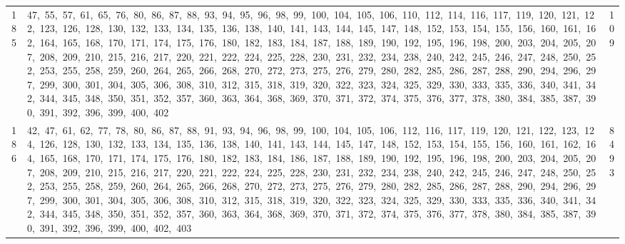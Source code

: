 \begin{longtable}{c|p{}|r}
185 & 47,\ 55,\ 57,\ 61,\ 65,\ 76,\ 80,\ 86,\ 87,\ 88,\ 93,\ 94,\ 95,\ 96,\ 98,\ 99,\ 100,\ 104,\ 105,\ 106,\ 110,\ 112,\ 114,\ 116,\ 117,\ 119,\ 120,\ 121,\ 122,\ 123,\ 126,\ 128,\ 130,\ 132,\ 133,\ 134,\ 135,\ 136,\ 138,\ 140,\ 141,\ 143,\ 144,\ 145,\ 147,\ 148,\ 152,\ 153,\ 154,\ 155,\ 156,\ 160,\ 161,\ 162,\ 164,\ 165,\ 168,\ 170,\ 171,\ 174,\ 175,\ 176,\ 180,\ 182,\ 183,\ 184,\ 187,\ 188,\ 189,\ 190,\ 192,\ 195,\ 196,\ 198,\ 200,\ 203,\ 204,\ 205,\ 207,\ 208,\ 209,\ 210,\ 215,\ 216,\ 217,\ 220,\ 221,\ 222,\ 224,\ 225,\ 228,\ 230,\ 231,\ 232,\ 234,\ 238,\ 240,\ 242,\ 245,\ 246,\ 247,\ 248,\ 250,\ 252,\ 253,\ 255,\ 258,\ 259,\ 260,\ 264,\ 265,\ 266,\ 268,\ 270,\ 272,\ 273,\ 275,\ 276,\ 279,\ 280,\ 282,\ 285,\ 286,\ 287,\ 288,\ 290,\ 294,\ 296,\ 297,\ 299,\ 300,\ 301,\ 304,\ 305,\ 306,\ 308,\ 310,\ 312,\ 315,\ 318,\ 319,\ 320,\ 322,\ 323,\ 324,\ 325,\ 329,\ 330,\ 333,\ 335,\ 336,\ 340,\ 341,\ 342,\ 344,\ 345,\ 348,\ 350,\ 351,\ 352,\ 357,\ 360,\ 363,\ 364,\ 368,\ 369,\ 370,\ 371,\ 372,\ 374,\ 375,\ 376,\ 377,\ 378,\ 380,\ 384,\ 385,\ 387,\ 390,\ 391,\ 392,\ 396,\ 399,\ 400,\ 402 & 109 \\
186 & 42,\ 47,\ 61,\ 62,\ 77,\ 78,\ 80,\ 86,\ 87,\ 88,\ 91,\ 93,\ 94,\ 96,\ 98,\ 99,\ 100,\ 104,\ 105,\ 106,\ 112,\ 116,\ 117,\ 119,\ 120,\ 121,\ 122,\ 123,\ 124,\ 126,\ 128,\ 130,\ 132,\ 133,\ 134,\ 135,\ 136,\ 138,\ 140,\ 141,\ 143,\ 144,\ 145,\ 147,\ 148,\ 152,\ 153,\ 154,\ 155,\ 156,\ 160,\ 161,\ 162,\ 164,\ 165,\ 168,\ 170,\ 171,\ 174,\ 175,\ 176,\ 180,\ 182,\ 183,\ 184,\ 186,\ 187,\ 188,\ 189,\ 190,\ 192,\ 195,\ 196,\ 198,\ 200,\ 203,\ 204,\ 205,\ 207,\ 208,\ 209,\ 210,\ 215,\ 216,\ 217,\ 220,\ 221,\ 222,\ 224,\ 225,\ 228,\ 230,\ 231,\ 232,\ 234,\ 238,\ 240,\ 242,\ 245,\ 246,\ 247,\ 248,\ 250,\ 252,\ 253,\ 255,\ 258,\ 259,\ 260,\ 264,\ 265,\ 266,\ 268,\ 270,\ 272,\ 273,\ 275,\ 276,\ 279,\ 280,\ 282,\ 285,\ 286,\ 287,\ 288,\ 290,\ 294,\ 296,\ 297,\ 299,\ 300,\ 301,\ 304,\ 305,\ 306,\ 308,\ 310,\ 312,\ 315,\ 318,\ 319,\ 320,\ 322,\ 323,\ 324,\ 325,\ 329,\ 330,\ 333,\ 335,\ 336,\ 340,\ 341,\ 342,\ 344,\ 345,\ 348,\ 350,\ 351,\ 352,\ 357,\ 360,\ 363,\ 364,\ 368,\ 369,\ 370,\ 371,\ 372,\ 374,\ 375,\ 376,\ 377,\ 378,\ 380,\ 384,\ 385,\ 387,\ 390,\ 391,\ 392,\ 396,\ 399,\ 400,\ 402,\ 403 & 8493 \\

\end{longtable}
